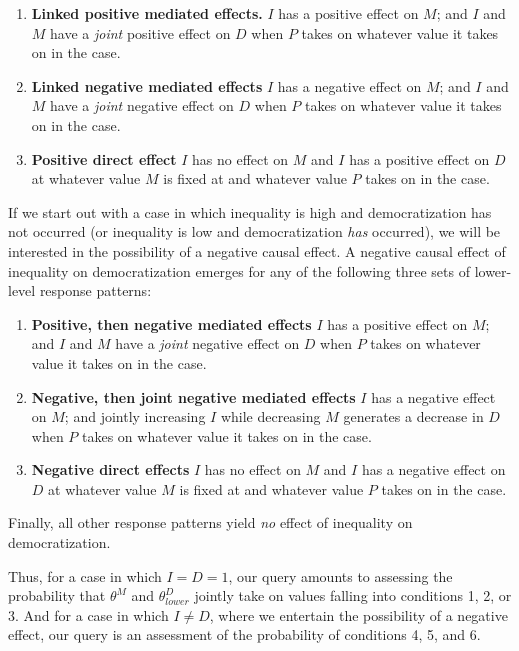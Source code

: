 \documentclass[12pt,]{book}
\begin{document}
\begin{enumerate}
\def\labelenumi{\arabic{enumi}.}
\item
  \textbf{Linked positive mediated effects.} \(I\) has a positive effect on \(M\); and \(I\) and \(M\) have a \emph{joint} positive effect on \(D\) when \(P\) takes on whatever value it takes on in the case.
\item
  \textbf{Linked negative mediated effects} \(I\) has a negative effect on \(M\); and \(I\) and \(M\) have a \emph{joint} negative effect on \(D\) when \(P\) takes on whatever value it takes on in the case.
\item
  \textbf{Positive direct effect} \(I\) has no effect on \(M\) and \(I\) has a positive effect on \(D\) at whatever value \(M\) is fixed at and whatever value \(P\) takes on in the case.
\end{enumerate}

If we start out with a case in which inequality is high and democratization has not occurred (or inequality is low and democratization \emph{has} occurred), we will be interested in the possibility of a negative causal effect. A negative causal effect of inequality on democratization emerges for any of the following three sets of lower-level response patterns:

\begin{enumerate}
\def\labelenumi{\arabic{enumi}.}
\setcounter{enumi}{3}
\item
  \textbf{Positive, then negative mediated effects} \(I\) has a positive effect on \(M\); and \(I\) and \(M\) have a \emph{joint} negative effect on \(D\) when \(P\) takes on whatever value it takes on in the case.
\item
  \textbf{Negative, then joint negative mediated effects} \(I\) has a negative effect on \(M\); and jointly increasing \(I\) while decreasing \(M\) generates a decrease in \(D\) when \(P\) takes on whatever value it takes on in the case.
\item
  \textbf{Negative direct effects} \(I\) has no effect on \(M\) and \(I\) has a negative effect on \(D\) at whatever value \(M\) is fixed at and whatever value \(P\) takes on in the case.
\end{enumerate}

Finally, all other response patterns yield \emph{no} effect of inequality on democratization.

Thus, for a case in which \(I=D=1\), our query amounts to assessing the probability that \(\theta^M\) and \(\theta^D_{lower}\) jointly take on values falling into conditions 1, 2, or 3. And for a case in which \(I \neq D\), where we entertain the possibility of a negative effect, our query is an assessment of the probability of conditions 4, 5, and 6.
\end{document}
